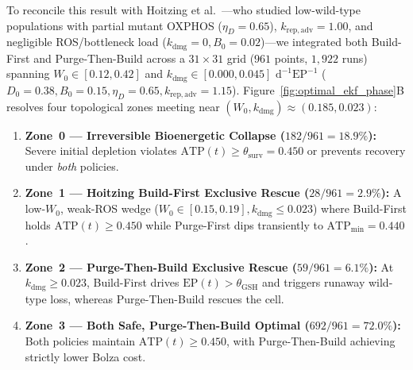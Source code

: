 \documentclass[11pt]{article}
\theoremstyle{plain}
\theoremstyle{remark}
\begin{document}
To reconcile this result with Hoitzing et al.~\cite{hoitzing2019energetic}---who studied low-wild-type populations with partial mutant OXPHOS ($\eta_D = 0.65$), $k_{\mathrm{rep,adv}} = 1.00$, and negligible ROS/bottleneck load ($k_{\mathrm{dmg}} = 0, B_0 = 0.02$)---we integrated both Build-First and Purge-Then-Build across a $31 \times 31$ grid ($961$ points, $1{,}922$ runs) spanning $W_0 \in [0.12, 0.42]$ and $k_{\mathrm{dmg}} \in [0.000, 0.045]\text{ d}^{-1}\text{EP}^{-1}$ ($D_0 = 0.38, B_0 = 0.15, \eta_D = 0.65, k_{\mathrm{rep,adv}} = 1.15$). Figure~\ref{fig:optimal_ekf_phase}B resolves four topological zones meeting near $(W_0, k_{\mathrm{dmg}}) \approx (0.185, 0.023)$:
\begin{enumerate}
  \item \textbf{Zone~0 --- Irreversible Bioenergetic Collapse ($182/961 = 18.9\%$):} Severe initial depletion violates $\mathrm{ATP}(t) \ge \theta_{\mathrm{surv}} = 0.450$ or prevents recovery under \textit{both} policies.
  \item \textbf{Zone~1 --- Hoitzing Build-First Exclusive Rescue ($28/961 = 2.9\%$):} A low-$W_0$, weak-ROS wedge ($W_0 \in [0.15, 0.19], k_{\mathrm{dmg}} \le 0.023$) where Build-First holds $\mathrm{ATP}(t) \ge 0.450$ while Purge-First dips transiently to $\mathrm{ATP}_{\min} = 0.440$.
  \item \textbf{Zone~2 --- Purge-Then-Build Exclusive Rescue ($59/961 = 6.1\%$):} At $k_{\mathrm{dmg}} \ge 0.023$, Build-First drives $\mathrm{EP}(t) > \theta_{\mathrm{GSH}}$ and triggers runaway wild-type loss, whereas Purge-Then-Build rescues the cell.
  \item \textbf{Zone~3 --- Both Safe, Purge-Then-Build Optimal ($692/961 = 72.0\%$):} Both policies maintain $\mathrm{ATP}(t) \ge 0.450$, with Purge-Then-Build achieving strictly lower Bolza cost.
\end{enumerate}
\end{document}
